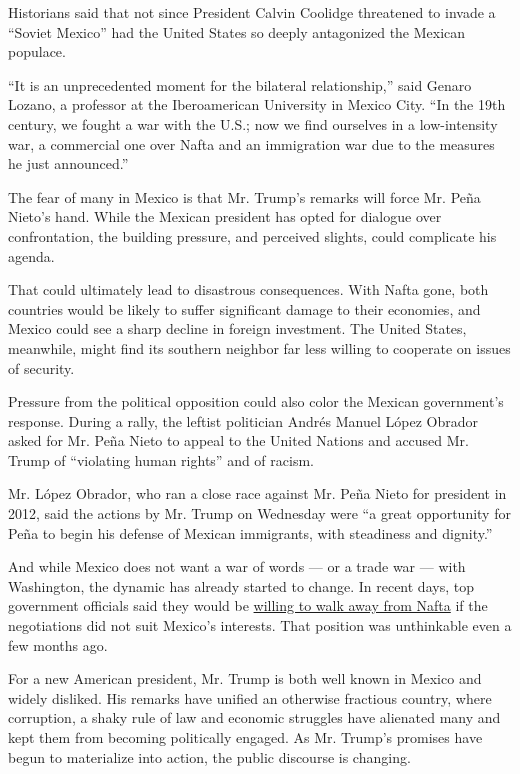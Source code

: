 Historians said that not since President Calvin Coolidge threatened to
invade a ``Soviet Mexico'' had the United States so deeply antagonized
the Mexican populace.

``It is an unprecedented moment for the bilateral relationship,'' said
Genaro Lozano, a professor at the Iberoamerican University in Mexico
City. ``In the 19th century, we fought a war with the U.S.; now we find
ourselves in a low-intensity war, a commercial one over Nafta and an
immigration war due to the measures he just announced.''

The fear of many in Mexico is that Mr. Trump's remarks will force Mr.
Peña Nieto's hand. While the Mexican president has opted for dialogue
over confrontation, the building pressure, and perceived slights, could
complicate his agenda.

That could ultimately lead to disastrous consequences. With Nafta gone,
both countries would be likely to suffer significant damage to their
economies, and Mexico could see a sharp decline in foreign investment.
The United States, meanwhile, might find its southern neighbor far less
willing to cooperate on issues of security.

Pressure from the political opposition could also color the Mexican
government's response. During a rally, the leftist politician Andrés
Manuel López Obrador asked for Mr. Peña Nieto to appeal to the United
Nations and accused Mr. Trump of ``violating human rights'' and of
racism.

Mr. López Obrador, who ran a close race against Mr. Peña Nieto for
president in 2012, said the actions by Mr. Trump on Wednesday were ``a
great opportunity for Peña to begin his defense of Mexican immigrants,
with steadiness and dignity.''

And while Mexico does not want a war of words --- or a trade war ---
with Washington, the dynamic has already started to change. In recent
days, top government officials said they would be
\href{https://www.nytimes3xbfgragh.onion/2017/01/24/world/americas/trump-mexico-nafta.html}{willing
to walk away from Nafta} if the negotiations did not suit Mexico's
interests. That position was unthinkable even a few months ago.

For a new American president, Mr. Trump is both well known in Mexico and
widely disliked. His remarks have unified an otherwise fractious
country, where corruption, a shaky rule of law and economic struggles
have alienated many and kept them from becoming politically engaged. As
Mr. Trump's promises have begun to materialize into action, the public
discourse is changing.

